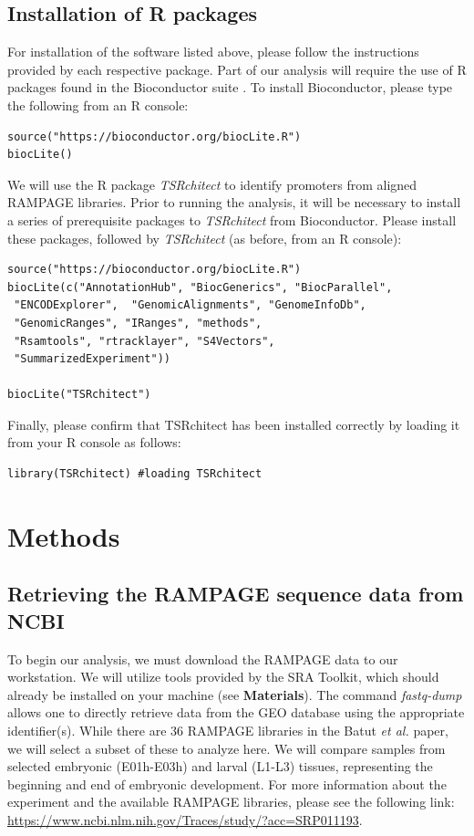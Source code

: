\documentclass[runningheads,a4paper]{llncs}
\begin{document}
\begin{linenumbers}
\subsection{Installation of R packages}
For installation of the software listed above, please follow the instructions provided by each respective package. 
Part of our analysis will require the use of R packages found in the Bioconductor suite \cite{Lawrence:2014gy}.
To install Bioconductor, please type the following from an R console: 

\noindent
\begin{verbatim}
source("https://bioconductor.org/biocLite.R")
biocLite()
\end{verbatim}

\noindent
We will use the R package \textit{TSRchitect} to identify promoters from aligned RAMPAGE libraries. 
Prior to running the analysis, it will be necessary to install a series of prerequisite packages to \textit{TSRchitect} from Bioconductor.
Please install these packages, followed by \textit{TSRchitect} (as before, from an R console):

\noindent
\begin{verbatim}
source("https://bioconductor.org/biocLite.R")
biocLite(c("AnnotationHub", "BiocGenerics", "BiocParallel",
 "ENCODExplorer",  "GenomicAlignments", "GenomeInfoDb",
 "GenomicRanges", "IRanges", "methods", 
 "Rsamtools", "rtracklayer", "S4Vectors",
 "SummarizedExperiment"))

biocLite("TSRchitect")
\end{verbatim}

\noindent
Finally, please confirm that TSRchitect has been installed correctly by loading it from your R console as follows:

\noindent
\begin{verbatim}
library(TSRchitect) #loading TSRchitect
\end{verbatim}

\section{Methods}

\subsection{Retrieving the RAMPAGE sequence data from NCBI}

To begin our analysis, we must download the RAMPAGE data to our workstation. 
We will utilize tools provided by the SRA Toolkit, which should already be installed on your machine (see \textbf{Materials}).
The command \textit{fastq-dump} allows one to directly retrieve data from the GEO database using the appropriate identifier(s).
While there are 36 RAMPAGE libraries in the Batut \textit{et al.} paper, we will select a subset of these to analyze here.
We will compare samples from selected embryonic (E01h-E03h) and larval (L1-L3) tissues, representing the beginning and end of embryonic development.
For more information about the experiment and the available RAMPAGE libraries, please see the following link: \url{https://www.ncbi.nlm.nih.gov/Traces/study/?acc=SRP011193}.\\


\end{linenumbers}
\end{document}
